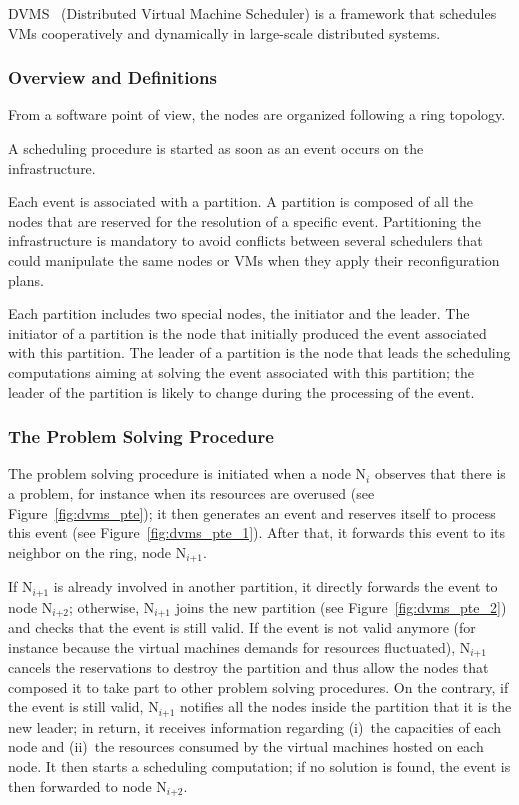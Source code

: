 DVMS~\cite{quesnel:cpe2012} (Distributed Virtual Machine
Scheduler) is a framework that schedules VMs cooperatively and dynamically in
large-scale distributed systems.

\subsubsection{Overview and Definitions}
From a software point of view, the nodes are organized following a ring
topology.

A scheduling procedure is started as soon
as an event occurs on the infrastructure.

Each event is associated with a partition.  A partition is composed of all the
nodes that are reserved for the resolution of a specific event.
%
Partitioning the infrastructure is mandatory to avoid conflicts between several
schedulers that could manipulate the same nodes or VMs when they apply their
reconfiguration plans.

Each partition includes two special nodes, the initiator and the leader.
The initiator of a partition is the node that
initially produced the event associated with this partition.
The leader of a partition is the node that leads the scheduling computations
aiming at solving the event associated with this partition; the leader of
the partition is likely to change during the processing of the event.


\subsubsection{The Problem Solving Procedure}

The problem solving procedure is initiated when a node
N\(_{\textit{i}}\) observes that there is a problem, for instance when its
resources are overused (see Figure~\ref{fig:dvms_pte}); it then generates an
event and reserves itself to process this event (see
Figure~\ref{fig:dvms_pte_1}).  After that, it forwards this event to its
neighbor on the ring, node N\(_{\textit{i+1}}\).

If N\(_{\textit{i+1}}\) is already involved in another partition, it directly
forwards the event to node N\(_{\textit{i+2}}\); otherwise, N\(_{\textit{i+1}}\)
joins the new partition (see Figure~\ref{fig:dvms_pte_2}) and checks that the
event is still valid.  If the event is not valid anymore (for instance because
the virtual machines demands for resources fluctuated), N\(_{\textit{i+1}}\)
cancels the reservations to destroy the partition and thus allow the nodes that
composed it to take part to other problem solving procedures.
%
On the contrary, if the event is still valid, N\(_{\textit{i+1}}\) notifies all
the nodes inside the partition that it is the new leader; in return, it receives
information regarding (i)~the capacities of each node and (ii)~the resources
consumed by the virtual machines hosted on each node.  It then starts a
scheduling computation; if no solution is found, the event is then forwarded to
node N\(_{\textit{i+2}}\).

